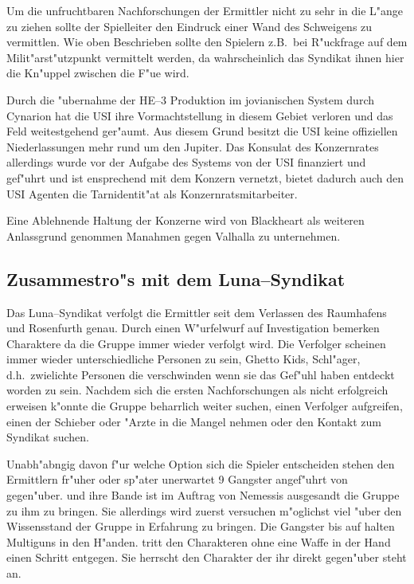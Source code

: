 \begin{remarks}
	Um die unfruchtbaren Nachforschungen der Ermittler nicht zu sehr in die L"ange zu ziehen sollte der Spielleiter den Eindruck einer Wand des Schweigens zu vermittlen. Wie oben Beschrieben sollte den Spielern z.B.~bei R"uckfrage auf dem Milit"arst"utzpunkt vermittelt werden, da\3 wahrscheinlich das Syndikat ihnen hier die Kn"uppel zwischen die F"u\3e wird.

	Durch die "ubernahme der HE--3 Produktion im jovianischen System durch Cynarion hat die USI ihre Vormachtstellung in diesem Gebiet verloren und das Feld weitestgehend ger"aumt. Aus diesem Grund besitzt die USI keine offiziellen Niederlassungen mehr rund um den Jupiter. Das Konsulat des Konzernrates allerdings wurde vor der Aufgabe des Systems von der USI finanziert und gef"uhrt und ist ensprechend mit dem Konzern vernetzt, bietet dadurch auch den USI Agenten die Tarnidentit"at als Konzernratsmitarbeiter.

	Eine Ablehnende Haltung der Konzerne wird von Blackheart als weiteren Anlassgrund genommen Ma\3nahmen gegen Valhalla zu unternehmen.
\end{remarks}

\subsection{Zusammestro"s mit dem Luna--Syndikat}
\newcommand{\xl}{\pinyin{Xiao3} \pinyin{Long2}}
\newcommand{\xlsn}{\pinyin{Xiao3} \pinyin{Long2}}

Das Luna--Syndikat verfolgt die Ermittler seit dem Verlassen des Raumhafens und Rosenfurth genau. Durch einen W"urfelwurf auf Investigation bemerken Charaktere da\3 die Gruppe immer wieder verfolgt wird. Die Verfolger scheinen immer wieder unterschiedliche Personen zu sein, Ghetto Kids, Schl"ager, d.h.~zwielichte Personen die verschwinden wenn sie das Gef"uhl haben entdeckt worden zu sein. Nachdem sich die ersten Nachforschungen als nicht erfolgreich erweisen k"onnte die Gruppe beharrlich weiter suchen, einen Verfolger aufgreifen, einen der Schieber oder "Arzte in die Mangel nehmen oder den Kontakt zum Syndikat suchen. 

Unabh"abngig davon f"ur welche Option sich die Spieler entscheiden stehen den Ermittlern fr"uher oder sp"ater unerwartet 9 Gangster angef"uhrt von \xl{} gegen"uber. \xlsn{} und ihre Bande ist im Auftrag von Nemessis ausgesandt die Gruppe zu ihm zu bringen. Sie allerdings wird zuerst versuchen m"oglichst viel "uber den Wissensstand der Gruppe in Erfahrung zu bringen. Die Gangster bis auf \xlsn{} halten Multiguns in den H"anden. \xlsn{} tritt den Charakteren ohne eine Waffe in der Hand einen Schritt entgegen. Sie herrscht den Charakter der ihr direkt gegen"uber steht an.

